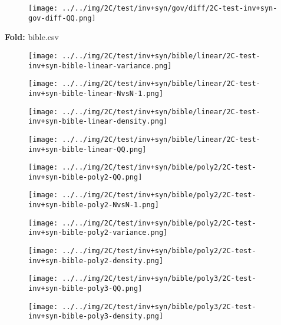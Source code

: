 \begin{figure}[H]
\centering	\texttt{[image: ../../img/2C/test/inv+syn/gov/diff/2C-test-inv+syn-gov-diff-QQ.png]}
\end{figure}
\textbf{Fold:} bible.csv
\begin{figure}[H]
\centering	\texttt{[image: ../../img/2C/test/inv+syn/bible/linear/2C-test-inv+syn-bible-linear-variance.png]}
\end{figure}
\begin{figure}[H]
\centering	\texttt{[image: ../../img/2C/test/inv+syn/bible/linear/2C-test-inv+syn-bible-linear-NvsN-1.png]}
\end{figure}
\begin{figure}[H]
\centering	\texttt{[image: ../../img/2C/test/inv+syn/bible/linear/2C-test-inv+syn-bible-linear-density.png]}
\end{figure}
\begin{figure}[H]
\centering	\texttt{[image: ../../img/2C/test/inv+syn/bible/linear/2C-test-inv+syn-bible-linear-QQ.png]}
\end{figure}
\begin{figure}[H]
\centering	\texttt{[image: ../../img/2C/test/inv+syn/bible/poly2/2C-test-inv+syn-bible-poly2-QQ.png]}
\end{figure}
\begin{figure}[H]
\centering	\texttt{[image: ../../img/2C/test/inv+syn/bible/poly2/2C-test-inv+syn-bible-poly2-NvsN-1.png]}
\end{figure}
\begin{figure}[H]
\centering	\texttt{[image: ../../img/2C/test/inv+syn/bible/poly2/2C-test-inv+syn-bible-poly2-variance.png]}
\end{figure}
\begin{figure}[H]
\centering	\texttt{[image: ../../img/2C/test/inv+syn/bible/poly2/2C-test-inv+syn-bible-poly2-density.png]}
\end{figure}
\begin{figure}[H]
\centering	\texttt{[image: ../../img/2C/test/inv+syn/bible/poly3/2C-test-inv+syn-bible-poly3-QQ.png]}
\end{figure}
\begin{figure}[H]
\centering	\texttt{[image: ../../img/2C/test/inv+syn/bible/poly3/2C-test-inv+syn-bible-poly3-density.png]}
\end{figure}
